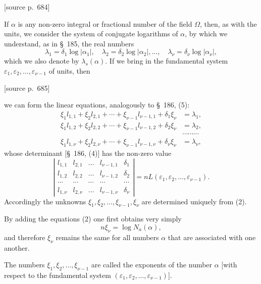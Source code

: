 \documentclass[11pt]{article}
\newcommand{\Na}{N_a}
\newcommand{\srcpage}[1]{\par\medskip\noindent\textsf{[source p.~#1]}\par\smallskip}
\begin{document}
\srcpage{684}
If $\alpha$ is any non-zero integral or fractional number of the field $\Omega$, then, as with the units, we consider the system of conjugate logarithms of $\alpha$, by which we understand, as in \S~185, the real numbers
\begin{equation}
\lambda_1=\delta_1\log|\alpha_1|,\quad
\lambda_2=\delta_2\log|\alpha_2|,\ldots,\quad
\lambda_\nu=\delta_\nu\log|\alpha_\nu|,
\tag{1}
\end{equation}
which we also denote by $\lambda_s(\alpha)$. If we bring in the fundamental system $\varepsilon_1,\varepsilon_2,\ldots,\varepsilon_{\nu-1}$ of units, then

\srcpage{685}
we can form the linear equations, analogously to \S~186, (5):
\begin{equation}
\begin{aligned}
\xi_1l_{1,1}+\xi_2l_{2,1}+\cdots+\xi_{\nu-1}l_{\nu-1,1}+\delta_1\xi_\nu&=\lambda_1,\\
\xi_1l_{1,2}+\xi_2l_{2,2}+\cdots+\xi_{\nu-1}l_{\nu-1,2}+\delta_2\xi_\nu&=\lambda_2,\\
&\cdots\cdots\cdots\\
\xi_1l_{1,\nu}+\xi_2l_{2,\nu}+\cdots+\xi_{\nu-1}l_{\nu-1,\nu}+\delta_\nu\xi_\nu&=\lambda_\nu,
\end{aligned}
\tag{2}
\end{equation}
whose determinant [\S~186, (4)] has the non-zero value
\begin{equation}
\left|
\begin{array}{ccccc}
l_{1,1}&l_{2,1}&\ldots&l_{\nu-1,1}&\delta_1\\
l_{1,2}&l_{2,2}&\ldots&l_{\nu-1,2}&\delta_2\\
\cdots&\cdots&\cdots&\cdots&\cdots\\
l_{1,\nu}&l_{2,\nu}&\ldots&l_{\nu-1,\nu}&\delta_\nu
\end{array}
\right|=nL(\varepsilon_1,\varepsilon_2,\ldots,\varepsilon_{\nu-1}).
\tag{3}
\end{equation}
Accordingly the unknowns $\xi_1,\xi_2,\ldots,\xi_{\nu-1},\xi_\nu$ are determined uniquely from (2).

By adding the equations (2) one first obtains very simply
\begin{equation}
n\xi_\nu=\log \Na(\alpha),
\tag{4}
\end{equation}
and therefore $\xi_\nu$ remains the same for all numbers $\alpha$ that are associated with one another.

The numbers $\xi_1,\xi_2,\ldots,\xi_{\nu-1}$ are called the exponents of the number $\alpha$ [with respect to the fundamental system $(\varepsilon_1,\varepsilon_2,\ldots,\varepsilon_{\nu-1})$].
\end{document}
